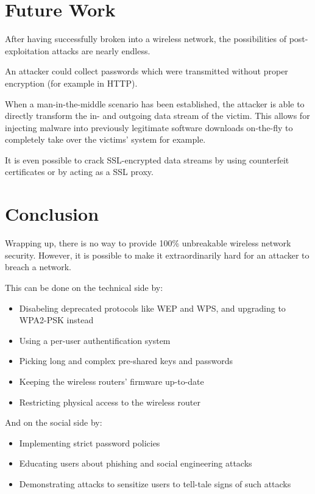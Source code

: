 \section{Future Work}

After having successfully broken into a wireless network, the possibilities of post-exploitation attacks are nearly endless.

An attacker could collect passwords which were transmitted without proper encryption (for example in HTTP).

When a man-in-the-middle scenario has been established, the attacker is able to directly transform the in- and outgoing data stream of the victim. This allows for injecting malware into previously legitimate software downloads on-the-fly to completely take over the victims' system for example.

It is even possible to crack SSL-encrypted data streams by using counterfeit certificates or by acting as a SSL proxy.

\section{Conclusion}

Wrapping up, there is no way to provide 100\% unbreakable wireless network security. However, it is possible to make it extraordinarily hard for an attacker to breach a network. 

This can be done on the technical side by:

\begin{itemize}

\item{Disabeling deprecated protocols like WEP and WPS, and upgrading to WPA2-PSK instead}

\item{Using a per-user authentification system}

\item{Picking long and complex pre-shared keys and passwords}

\item{Keeping the wireless routers' firmware up-to-date}

\item{Restricting physical access to the wireless router}

\end{itemize}

And on the social side by:

\begin{itemize}

\item{Implementing strict password policies}

\item{Educating users about phishing and social engineering attacks}

\item{Demonstrating attacks to sensitize users to tell-tale signs of such attacks}

\end{itemize}